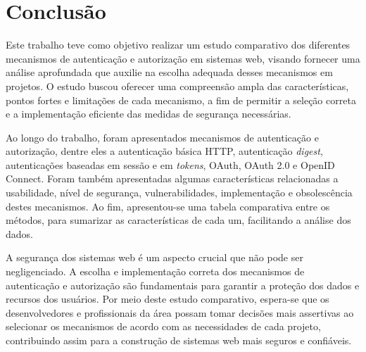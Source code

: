 \section{Conclusão}

Este trabalho teve como objetivo realizar um estudo comparativo dos diferentes mecanismos de 
autenticação e autorização em sistemas web, visando fornecer uma análise aprofundada que auxilie na 
escolha adequada desses mecanismos em projetos. O estudo buscou oferecer uma compreensão ampla das 
características, pontos fortes e limitações de cada mecanismo, a fim de permitir a seleção correta 
e a implementação eficiente das medidas de segurança necessárias.

Ao longo do trabalho, foram apresentados mecanismos de autenticação e autorização, dentre eles a
autenticação básica HTTP, autenticação \emph{digest}, autenticações baseadas em sessão e em 
\emph{tokens}, OAuth, OAuth 2.0 e OpenID Connect. Foram também apresentadas algumas 
características relacionadas a usabilidade, nível de segurança, vulnerabilidades, implementação e 
obsolescência destes mecanismos. Ao fim, apresentou-se uma tabela comparativa entre os métodos, para
sumarizar as características de cada um, facilitando a análise dos dados. 

A segurança dos sistemas web é um aspecto crucial que não pode ser negligenciado. A escolha e 
implementação correta dos mecanismos de autenticação e autorização são fundamentais para garantir 
a proteção dos dados e recursos dos usuários. Por meio deste estudo comparativo, espera-se que os 
desenvolvedores e profissionais da área possam tomar decisões mais assertivas ao selecionar os 
mecanismos de acordo com as necessidades de cada projeto, contribuindo assim para a 
construção de sistemas web mais seguros e confiáveis.